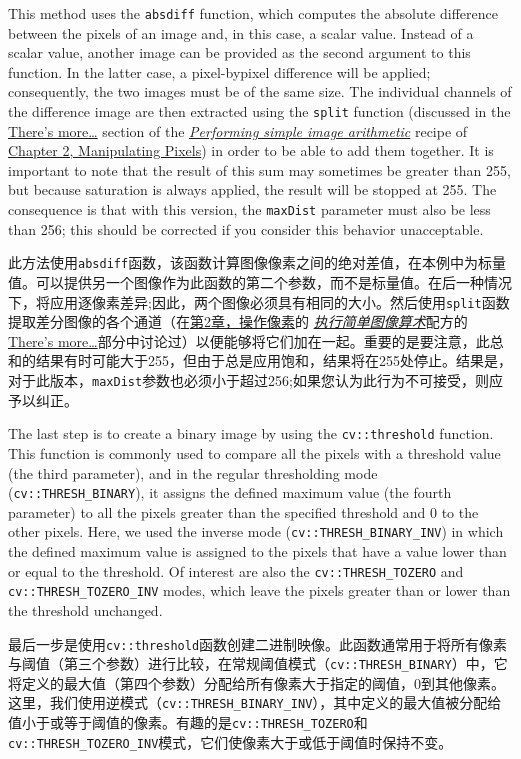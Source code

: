 \documentclass[]{article}
\begin{document}
This method uses the \texttt{absdiff} function, which computes the
absolute difference between the pixels of an image and, in this case, a
scalar value. Instead of a scalar value, another image can be provided
as the second argument to this function. In the latter case, a
pixel-bypixel difference will be applied; consequently, the two images
must be of the same size. The individual channels of the difference
image are then extracted using the \texttt{split} function (discussed in
the \href{}{There's more\ldots{}} section of the
\emph{\href{}{Performing simple image arithmetic}} recipe of
\href{}{Chapter 2, Manipulating Pixels}) in order to be able to add them
together. It is important to note that the result of this sum may
sometimes be greater than 255, but because saturation is always applied,
the result will be stopped at 255. The consequence is that with this
version, the \texttt{maxDist} parameter must also be less than 256; this
should be corrected if you consider this behavior unacceptable.

此方法使用\texttt{absdiff}函数，该函数计算图像像素之间的绝对差值，在本例中为标量值。可以提供另一个图像作为此函数的第二个参数，而不是标量值。在后一种情况下，将应用逐像素差异;因此，两个图像必须具有相同的大小。然后使用\texttt{split}函数提取差分图像的各个通道（在\href{}{第2章，操作像素}的
\href{}{\emph{执行简单图像算术}}配方的\href{}{There's
more\ldots{}}部分中讨论过）以便能够将它们加在一起。重要的是要注意，此总和的结果有时可能大于255，但由于总是应用饱和，结果将在255处停止。结果是，对于此版本，\texttt{maxDist}参数也必须小于超过256;如果您认为此行为不可接受，则应予以纠正。

The last step is to create a binary image by using the
\texttt{cv::threshold} function. This function is commonly used to
compare all the pixels with a threshold value (the third parameter), and
in the regular thresholding mode (\texttt{cv::THRESH\_BINARY}), it
assigns the defined maximum value (the fourth parameter) to all the
pixels greater than the specified threshold and 0 to the other pixels.
Here, we used the inverse mode (\texttt{cv::THRESH\_BINARY\_INV}) in
which the defined maximum value is assigned to the pixels that have a
value lower than or equal to the threshold. Of interest are also the
\texttt{cv::THRESH\_TOZERO} and \texttt{cv::THRESH\_TOZERO\_INV} modes,
which leave the pixels greater than or lower than the threshold
unchanged.

最后一步是使用\texttt{cv::threshold}函数创建二进制映像。此函数通常用于将所有像素与阈值（第三个参数）进行比较，在常规阈值模式（\texttt{cv::THRESH\_BINARY}）中，它将定义的最大值（第四个参数）分配给所有像素大于指定的阈值，0到其他像素。这里，我们使用逆模式（\texttt{cv::THRESH\_BINARY\_INV}），其中定义的最大值被分配给值小于或等于阈值的像素。有趣的是\texttt{cv::THRESH\_TOZERO}和\texttt{cv::THRESH\_TOZERO\_INV}模式，它们使像素大于或低于阈值时保持不变。
\end{document}
